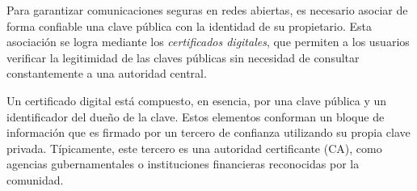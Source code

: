 



Para garantizar comunicaciones seguras en redes abiertas, es necesario asociar de forma confiable una clave pública con la identidad de su propietario. Esta asociación se logra mediante los \textit{certificados digitales}, que permiten a los usuarios verificar la legitimidad de las claves públicas sin necesidad de consultar constantemente a una autoridad central.

Un certificado digital está compuesto, en esencia, por una clave pública y un identificador del dueño de la clave. Estos elementos conforman un bloque de información que es firmado por un tercero de confianza utilizando su propia clave privada. Típicamente, este tercero es una autoridad certificante (CA), como agencias gubernamentales o instituciones financieras reconocidas por la comunidad.

